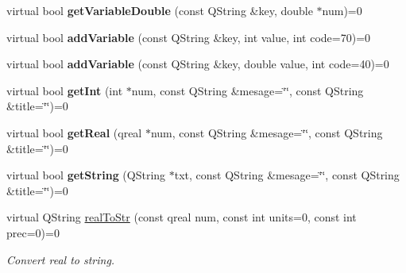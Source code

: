 \begin{DoxyCompactItemize}
\item 
\hypertarget{classDocument__Interface_a46861f32470ba271a384e26c40a3646f}{virtual bool {\bfseries get\-Variable\-Double} (const Q\-String \&key, double $\ast$num)=0}\label{classDocument__Interface_a46861f32470ba271a384e26c40a3646f}

\item 
\hypertarget{classDocument__Interface_a182b7a4f8071ce2e281a393a1abee784}{virtual bool {\bfseries add\-Variable} (const Q\-String \&key, int value, int code=70)=0}\label{classDocument__Interface_a182b7a4f8071ce2e281a393a1abee784}

\item 
\hypertarget{classDocument__Interface_a813cf1321cfb327e5123824ddcc55320}{virtual bool {\bfseries add\-Variable} (const Q\-String \&key, double value, int code=40)=0}\label{classDocument__Interface_a813cf1321cfb327e5123824ddcc55320}

\item 
\hypertarget{classDocument__Interface_a13d29dddfa876fc3fd021e6beb1c6aa8}{virtual bool {\bfseries get\-Int} (int $\ast$num, const Q\-String \&mesage=\char`\"{}\char`\"{}, const Q\-String \&title=\char`\"{}\char`\"{})=0}\label{classDocument__Interface_a13d29dddfa876fc3fd021e6beb1c6aa8}

\item 
\hypertarget{classDocument__Interface_a46757c2b46b9543f36134ff1a15e0032}{virtual bool {\bfseries get\-Real} (qreal $\ast$num, const Q\-String \&mesage=\char`\"{}\char`\"{}, const Q\-String \&title=\char`\"{}\char`\"{})=0}\label{classDocument__Interface_a46757c2b46b9543f36134ff1a15e0032}

\item 
\hypertarget{classDocument__Interface_afcb452f37ab67f84f896bf254f4fa162}{virtual bool {\bfseries get\-String} (Q\-String $\ast$txt, const Q\-String \&mesage=\char`\"{}\char`\"{}, const Q\-String \&title=\char`\"{}\char`\"{})=0}\label{classDocument__Interface_afcb452f37ab67f84f896bf254f4fa162}

\item 
virtual Q\-String \hyperlink{classDocument__Interface_a102c168174f9a7f6634629dcfef761e1}{real\-To\-Str} (const qreal num, const int units=0, const int prec=0)=0
\begin{DoxyCompactList}\small\item\em Convert real to string. \end{DoxyCompactList}\end{DoxyCompactItemize}


